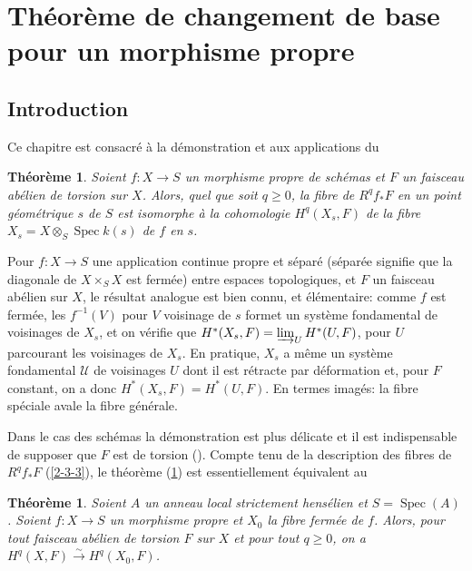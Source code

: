 \documentclass{article}
\DeclareMathOperator{\spec}{Spec}
\newcommand{\cU}{\mathcal{U}}
\newcommand{\iso}{\xrightarrow\sim}
\newtheorem{theorem}[subsubsection]{Théorème}
\begin{document}
\section{Théorème de changement de base pour un morphisme propre}\label{4}










\subsection{Introduction}\label{4-1}

Ce chapitre est consacr\'e \`a la d\'emonstration et aux applications du 





\begin{theorem}\label{4-1-1}
Soient $f:X\to S$ un morphisme propre de sch\'emas et $F$ un faisceau abélien 
de torsion sur $X$. Alors, quel que soit $q\geqslant 0$, la fibre de 
$R^q f_* F$ en un point g\'eom\'etrique $s$ de $S$ est isomorphe \`a la 
cohomologie $H^q(X_s,F)$ de la fibre $X_s=X\otimes_S \spec k(s)$ de $f$ en 
$s$. 
\end{theorem}

Pour $f:X\to S$ une application continue propre et s\'epar\'e (s\'epar\'ee 
signifie que la diagonale de $X\times_S X$ est ferm\'ee) entre espaces 
topologiques, et $F$ un faisceau ab\'elien sur $X$, le r\'esultat analogue est 
bien connu, et \'el\'ementaire: comme $f$ est ferm\'ee, les $f^{-1}(V)$ pour 
$V$ voisinage de $s$ formet un syst\`eme fondamental de voisinages de $X_s$, et 
on v\'erifie que $H^*(X_s,F) = \varinjlim_U H^*(U,F)$, pour $U$ parcourant les 
voisinages de $X_s$. En pratique, $X_s$ a m\^eme un syst\`eme fondamental 
$\cU$ de voisinages $U$ dont il est r\'etracte par d\'eformation et, pour $F$ 
constant, on a donc $H^*(X_s,F)=H^*(U,F)$. En termes imag\'es: la fibre 
sp\'eciale avale la fibre g\'en\'erale. 

Dans le cas des sch\'emas la d\'emonstration est plus d\'elicate et il est 
indispensable de supposer que $F$ est de torsion (\cite[XII.2]{4}). Compte 
tenu de la description des fibres de $R^q f_* F$ (\ref{2-3-3}), le théorème 
(\ref{4-1-1}) est essentiellement \'equivalent au 

 
  
   
    
\begin{theorem}\label{4-1-2}
Soient $A$ un anneau local strictement hens\'elien et $S=\spec(A)$. Soient 
$f:X\to S$ un morphisme propre et $X_0$ la fibre ferm\'ee de $f$. Alors, pour 
tout faisceau ab\'elien de torsion $F$ sur $X$ et pour tout $q\geqslant 0$, on 
a $H^q(X,F) \iso H^q(X_0,F)$. 
\end{theorem} 
\end{document}
